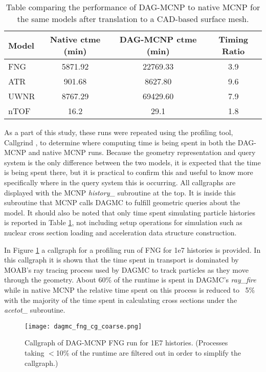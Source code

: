 \begin{table}[H]
  \centering
  \begin{tabular}{l c c c}
    \toprule
    Model & Native ctme (min) & DAG-MCNP ctme (min) & Timing Ratio \\
    \hline
    FNG   & 5871.92           & 22769.33            & 3.9   \\
    ATR   & 901.68            & 8627.80             & 9.6   \\
    UWNR  & 8767.29           & 69429.60            & 7.9   \\
    nTOF  & 16.2              & 29.1                & 1.8   \\
    \hline
  \end{tabular}
  \caption{Table comparing the performance of DAG-MCNP to native MCNP for the
    same models after translation to a CAD-based surface mesh.}
  \label{dag-mcnp-benchmarks}  
\end{table}

As a part of this study, these runs were repeated using the profiling tool,
Callgrind \cite{Pena_2016}, to determine where computing time is being spent in
both the DAG-MCNP and native MCNP runs. Because the geometry representation and
query system is the only difference between the two models, it is expected that
the time is being spent there, but it is practical to confirm this and useful to
know more specifically where in the query system this is occurring. All
callgraphs are displayed with the MCNP \textit{history\_} subroutine at the
top. It is inside this subroutine that MCNP calls DAGMC to fulfill geometric
queries about the model. It should also be noted that only time spent simulating
particle histories is reported in Table \ref{dag-mcnp-benchmarks}, not including
setup operations for simulation such as nuclear cross section loading and
acceleration data structure construction.

In Figure \ref{dagmc-fng-coarse} a callgraph for a profiling run of FNG for 1e7
histories is provided. In this callgraph it is shown that the time spent in
transport is dominated by MOAB's ray tracing process used by DAGMC to track
particles as they move through the geometry. About 60\% of the runtime is spent
in DAGMC's \textit{ray\_fire} while in native MCNP the relative time spent on
this process is reduced to ~5\% with the majority of the time spent in
calculating cross sections under the \textit{acetot\_} subroutine.

\begin{figure}[H]
  \centering
  \caption{Callgraph of DAG-MCNP FNG run for \num{1E7} histories. (Processes taking
    $<$10\% of the runtime are filtered out in order to simplify the callgraph.)}
  \label{dagmc-fng-coarse}
  \texttt{[image: dagmc\_fng\_cg\_coarse.png]}
\end{figure}

